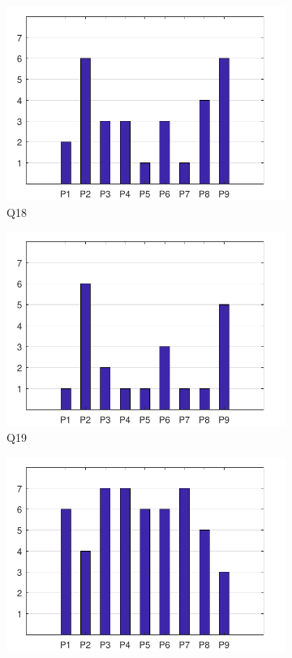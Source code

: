 \documentclass[english, 12pt, a4paper, pdftex, elec, utf8]{aaltothesis}
\begin{document}
\begin{figure}[h!]
\begin{subfigure}[b]{0.49\textwidth}
        \includegraphics[width=\textwidth]{T2_9.pdf}
        \caption*{Q18}
    \end{subfigure}
    \begin{subfigure}[b]{0.49\textwidth}
        \includegraphics[width=\textwidth]{T2_10.pdf}
        \caption*{Q19}
    \end{subfigure}
    \begin{subfigure}[b]{0.49\textwidth}
        \includegraphics[width=\textwidth]{T2_11.pdf}

\end{subfigure}
\end{figure}
\end{document}
